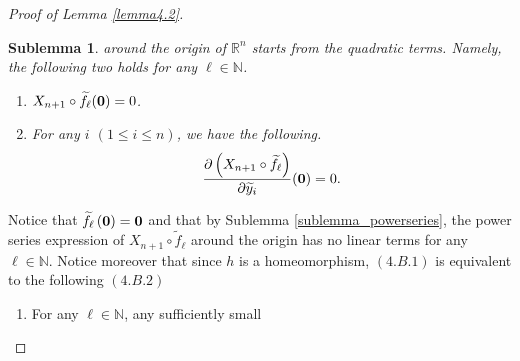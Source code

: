 \documentclass{amsart}
\newtheorem{sublemma}{Sublemma}[section]
\theoremstyle{definition}
\theoremstyle{definition}
\theoremstyle{definition}
\newcommand{\ch}[1]{{\color{black} #1}}
\begin{document}
{{\begin{proof}[Proof of Lemma \ref{lemma4.2}]
{\begin{sublemma}
around the origin of $\mathbb{R}^n$ starts from the quadratic terms.   
Namely, the following two holds for any $\ell\in \mathbb{N}$.    
\begin{enumerate}
\item[(1)] $X_{n+1}\circ \widetilde{f}_\ell({\bf 0})=0$.   
\item[(2)] 
For any $i$ $(1\le i\le n)$, we have the following.   
\[
\frac{\partial \left(X_{n+1}\circ \widetilde{f}_\ell\right)}
{\partial \widetilde{y}_i}({\bf 0}) = 0.   
\]
\end{enumerate}
\end{sublemma}
Notice that $\widetilde{f}_\ell\left({\bf 0}\right)={\bf 0}$ 
and that by Sublemma \ref{sublemma_powerseries}, 
the power series expression of $X_{n+1}\circ \widetilde{f}_\ell$ 
around the origin has no linear terms for any $\ell\in \mathbb{N}$.    
Notice moreover that \ch{since $h$ is a homeomorphism}, $(4.B.1)$ is equivalent to the following $(4.B.2)$
\smallskip 
\begin{enumerate}
\item[$(4.B.2)$] For any $\ell\in \mathbb{N}$, any sufficiently small 

\end{enumerate}}
\end{proof}}}
\end{document}
